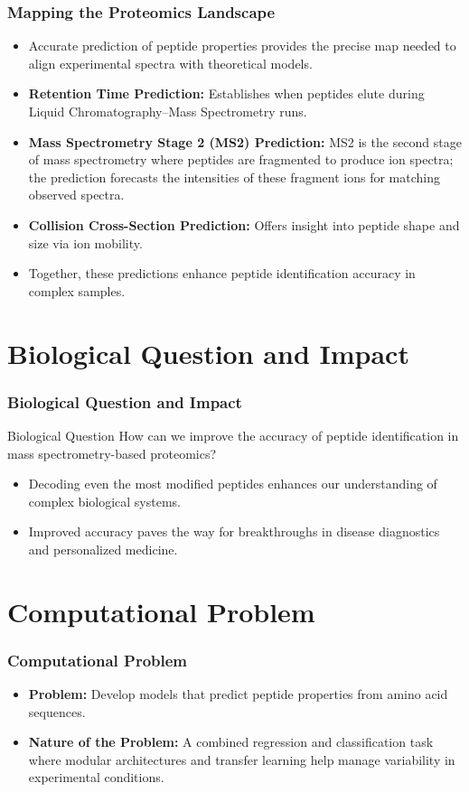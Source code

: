 \documentclass{beamer}
\begin{document}
\begin{frame}
  \frametitle{Mapping the Proteomics Landscape}
  \begin{itemize}
    \item Accurate prediction of peptide properties provides the precise map needed to align experimental spectra with theoretical models.
    \item \textbf{Retention Time Prediction:} Establishes when peptides elute during Liquid Chromatography–Mass Spectrometry runs.
    \item \textbf{Mass Spectrometry Stage 2 (MS2) Prediction:} MS2 is the second stage of mass spectrometry where peptides are fragmented to produce ion spectra; the prediction forecasts the intensities of these fragment ions for matching observed spectra.
    \item \textbf{Collision Cross-Section Prediction:} Offers insight into peptide shape and size via ion mobility.
    \item Together, these predictions enhance peptide identification accuracy in complex samples.
  \end{itemize}
\end{frame}

\section{Biological Question and Impact}
\begin{frame}
  \frametitle{Biological Question and Impact}
  \begin{block}{Biological Question}
    How can we improve the accuracy of peptide identification in mass spectrometry-based proteomics?
  \end{block}
  \begin{itemize}
    \item Decoding even the most modified peptides enhances our understanding of complex biological systems.
    \item Improved accuracy paves the way for breakthroughs in disease diagnostics and personalized medicine.
  \end{itemize}
\end{frame}

\section{Computational Problem}
\begin{frame}
  \frametitle{Computational Problem}
  \begin{itemize}
    \item \textbf{Problem:} Develop models that predict peptide properties from amino acid sequences.
    \item \textbf{Nature of the Problem:} A combined regression and classification task where modular architectures and transfer learning help manage variability in experimental conditions.
  \end{itemize}
\end{frame}
\end{document}

